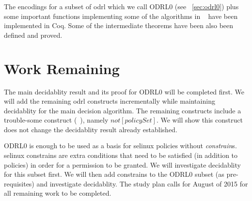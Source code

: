 The encodings for a subset of \ac{odrl} which we call ODRL0 (see ~\ref{sec:odrl0}) plus some important functions implementing some of the algorithms in ~\cite{pucella2006} have been implemented in Coq. Some of the intermediate theorems have been also been defined and proved.

\section{Work Remaining}
The main decidablity result and its proof for ODRL0 will be completed first. We will add the remaining \ac{odrl} constructs incrementally while maintaining decidablity for the main decision algorithm. The remaining constructs include a trouble-some construct (~\cite{pucella2006}), namely $not[policySet]$. We will show this construct does not change the decidablity result already established. 

ODRL0 is enough to be used as a basis for \ac{selinux} policies without \emph{constrain}s. \ac{selinux} constrains are extra  conditions that need to be satisfied (in addition to policies) in order for a permission to be granted. We will investigate decidablity for this subset first. We will then add constrains to the ODRL0 subset (as pre-requisites) and investigate decidablity. The study plan calls for August of 2015 for all remaining work to be completed.













